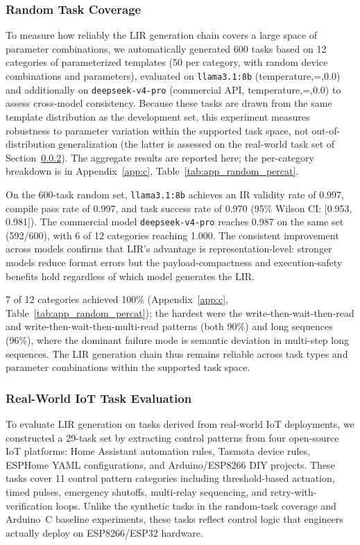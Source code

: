\documentclass[a4paper,fleqn,longmktitle]{cas-dc}
\begin{document}
\subsubsection{Random Task Coverage}
\label{sec:res_random}

To measure how reliably the LIR generation chain covers a large space of parameter combinations, we automatically generated 600 tasks based on 12 categories of parameterized templates (50 per category, with random device combinations and parameters), evaluated on \texttt{llama3.1:8b} (temperature,=,0.0) and additionally on \texttt{deepseek-v4-pro} (commercial API, temperature,=,0.0) to assess cross-model consistency. Because these tasks are drawn from the same template distribution as the development set, this experiment measures robustness to parameter variation within the supported task space, not out-of-distribution generalization (the latter is assessed on the real-world task set of Section~\ref{sec:res_realworld}). The aggregate results are reported here; the per-category breakdown is in Appendix~\ref{app:c}, Table~\ref{tab:app_random_percat}.

On the 600-task random set, \texttt{llama3.1:8b} achieves an IR validity rate of 0.997, compile pass rate of 0.997, and task success rate of 0.970 (95\% Wilson CI: [0.953, 0.981]). The commercial model \texttt{deepseek-v4-pro} reaches 0.987 on the same set (592/600), with 6 of 12 categories reaching 1.000. The consistent improvement across models confirms that LIR's advantage is representation-level: stronger models reduce format errors but the payload-compactness and execution-safety benefits hold regardless of which model generates the LIR.

7 of 12 categories achieved 100\% (Appendix~\ref{app:c}, Table~\ref{tab:app_random_percat}); the hardest were the write-then-wait-then-read and write-then-wait-then-multi-read patterns (both 90\%) and long sequences (96\%), where the dominant failure mode is semantic deviation in multi-step long sequences. The LIR generation chain thus remains reliable across task types and parameter combinations within the supported task space.

\subsubsection{Real-World IoT Task Evaluation}
\label{sec:res_realworld}

To evaluate LIR generation on tasks derived from real-world IoT deployments, we constructed a 29-task set by extracting control patterns from four open-source IoT platforms: Home Assistant automation rules, Tasmota device rules, ESPHome YAML configurations, and Arduino/ESP8266 DIY projects. These tasks cover 11 control pattern categories including threshold-based actuation, timed pulses, emergency shutoffs, multi-relay sequencing, and retry-with-verification loops. Unlike the synthetic tasks in the random-task coverage and Arduino~C baseline experiments, these tasks reflect control logic that engineers actually deploy on ESP8266/ESP32 hardware.
\end{document}
